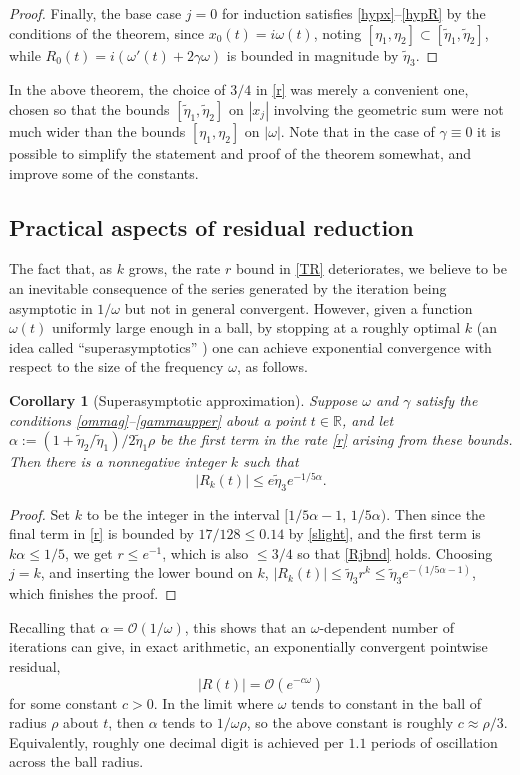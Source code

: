 \documentclass[10pt]{article}
\newcommand{\R}{\mathbb{R}}
\newcommand{\bigO}{{\mathcal O}}
\newtheorem{cor}[thm]{Corollary}
\newcommand{\om}{\omega}
\newcommand{\g}{\gamma}
\newcommand{\te}{\tilde\eta}
\begin{document}
\begin{proof}
Finally, the base case $j=0$ for induction
satisfies \cref{hypx}--\cref{hypR}
by the conditions of the theorem,
since $x_0(t) = i\om(t)$, noting $[\eta_1,\eta_2] \subset [\te_1,\te_2]$,
while $R_0(t) = i\left(\om'(t) + 2\g\om \right)$ is bounded in magnitude by $\te_3$.
\end{proof}

In the above theorem, the choice of $3/4$ in \cref{r} was merely a convenient one, chosen so that the bounds $[\te_1,\te_2]$ on $|x_j|$
involving the geometric sum were
not much wider than the bounds $[\eta_1,\eta_2]$ on $|\om|$.
Note that in the case of $\gamma\equiv 0$ it is possible to
simplify the statement and proof of the theorem somewhat,
and improve some of the constants.


\subsection{Practical aspects of residual reduction \label{pracres}}

The fact that, as $k$ grows,
the rate $r$ bound in \cref{TR} deteriorates, we believe to be
an inevitable consequence of
the series generated by the iteration being asymptotic in $1/\om$ but not in general convergent.
However, given a function $\om(t)$ uniformly large enough
in a ball,
by stopping at a roughly optimal $k$ (an idea
called ``superasymptotics'' \cite{berrysuper,boydsuper})
one can achieve
exponential convergence with respect to the size of the frequency $\om$,
as follows.

\begin{cor}[Superasymptotic approximation]\label{super}
  Suppose $\om$ and $\g$ satisfy the conditions \cref{ommag}--\cref{gammaupper}
  about a point $t\in\R$,
  and let $\alpha := (1+\te_2/\te_1)/2\te_1\rho$ be the
  first term in the rate \cref{r} arising from these bounds.
  Then there is a nonnegative integer $k$ such that
  $$
  |R_k(t)|  \le  e \te_3 e^{-1/5\alpha}.
  $$
\end{cor}
\begin{proof}
  Set $k$ to be the integer in the interval $[1/5\alpha-1, \, 1/5\alpha)$.
    Then since the final term in \cref{r} is bounded by $17/128 \leq 0.14$
    by \cref{slight}, and the
    first term is $k\alpha \le 1/5$, we get $r\le e^{-1}$, which
    is also $\le 3/4$ so that \cref{Rjbnd} holds.
    Choosing $j=k$, and inserting the lower bound on $k$,
    $|R_k(t)| \le \te_3 r^k \le \te_3 e^{-(1/5\alpha-1)}$, which
    finishes the proof.
  \end{proof}
Recalling that $\alpha = \bigO(1/\om)$, this
shows that an $\om$-dependent
number of iterations can give, in exact arithmetic, an
exponentially convergent pointwise residual,
$$
|R(t)| = \bigO(e^{-c\om})
$$
for some constant $c>0$.
In the limit where
$\om$ tends to constant in the ball of radius $\rho$ about $t$, then
$\alpha$ tends to $1/\om\rho$, so the above
constant is roughly $c\approx \rho/3$.
Equivalently, roughly one decimal digit is achieved per
$1.1$ periods of oscillation across the ball radius.
\end{document}
